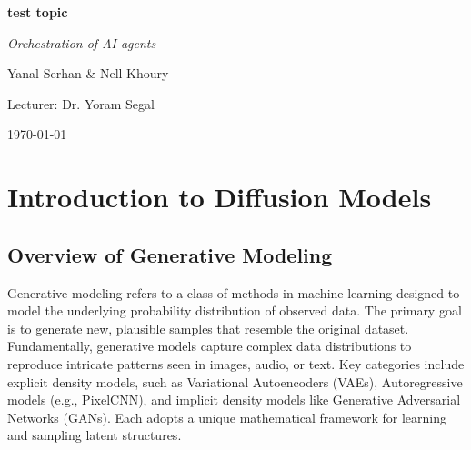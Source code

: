 \documentclass[a4paper,12pt,oneside]{memoir}
\begin{document}
\frontmatter

\begin{titlingpage}
    \centering
    \vspace*{2cm}
    
    {\Huge\bfseries\color{chaptercolor} test topic \par}
    \vspace{0.5cm}
    {\LARGE\itshape Orchestration of AI agents\par}
    
    \vspace{2.5cm}
    
    {\Large Yanal Serhan \& Nell Khoury\par}
    \vspace{0.5cm}
    {\large Lecturer: Dr. Yoram Segal\par}
    
    \vfill
    
    {\large \today\par}
\end{titlingpage}

\begin{abstract}
\noindent Generated book on test topic.
\end{abstract}

\clearpage
\tableofcontents
\clearpage
\listoffigures
\clearpage
\listoftables

\mainmatter

\chapter{Introduction to Diffusion Models}

\section{Overview of Generative Modeling}

Generative modeling refers to a class of methods in machine learning designed to model the underlying probability distribution of observed data. The primary goal is to generate new, plausible samples that resemble the original dataset. Fundamentally, generative models capture complex data distributions to reproduce intricate patterns seen in images, audio, or text. Key categories include explicit density models, such as Variational Autoencoders (VAEs), Autoregressive models (e.g., PixelCNN), and implicit density models like Generative Adversarial Networks (GANs). Each adopts a unique mathematical framework for learning and sampling latent structures.
\end{document}
